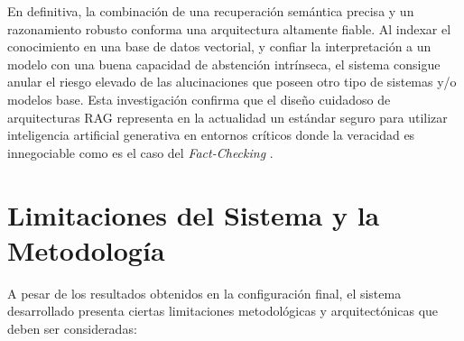 En definitiva, la combinación de una recuperación semántica precisa y un razonamiento robusto conforma una arquitectura altamente fiable. Al indexar el conocimiento en una base de datos vectorial, y confiar la interpretación a un modelo con una buena capacidad de abstención intrínseca, el sistema consigue anular el riesgo elevado de las alucinaciones que poseen otro tipo de sistemas y/o modelos base. Esta investigación confirma que el diseño cuidadoso de arquitecturas RAG representa en la actualidad un estándar seguro para utilizar inteligencia artificial generativa en entornos críticos donde la veracidad es innegociable como es el caso del \textit{Fact-Checking} .

\section{Limitaciones del Sistema y la Metodología}

A pesar de los resultados obtenidos en la configuración final, el sistema desarrollado presenta ciertas limitaciones metodológicas y arquitectónicas que deben ser consideradas:

